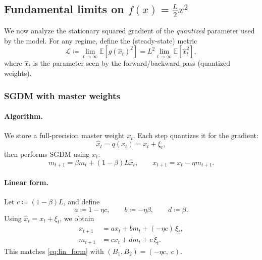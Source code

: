 \documentclass[11pt, a4paper, onecolumn, copyright, goog]{google}
\newcommand{\E}{\mathbb{E}}
\theoremstyle{plain}
\theoremstyle{definition}
\theoremstyle{remark}
\begin{document}
\subsection{Fundamental limits on $f(x)=\frac{L}{2}x^2$}

We now analyze the stationary squared gradient of the \emph{quantized} parameter used by the model.
For any regime, define the (steady-state) metric
\begin{equation}
    \mathcal L \coloneqq \lim_{t\to\infty}\E[g(\hat x_t)^2]
    = L^2 \lim_{t\to\infty}\E[\hat x_t^2],
\end{equation}
where $\hat x_t$ is the parameter seen by the forward/backward pass (quantized weights).

\subsubsection{SGDM with master weights}

\paragraph{Algorithm.}
We store a full-precision master weight $x_t$. Each step quantizes it for the gradient:
\begin{equation}
    \hat x_t=q(x_t)=x_t+\xi_t,
\end{equation}
then performs SGDM using $\hat x_t$:
\begin{equation}
    m_{t+1}=\beta m_t + (1-\beta)L\hat x_t,\qquad x_{t+1}=x_t-\eta m_{t+1}.
\end{equation}

\paragraph{Linear form.}
Let $c\coloneqq (1-\beta)L$, and define
\begin{equation}
    a\coloneqq 1-\eta c,\qquad b\coloneqq -\eta\beta,\qquad d\coloneqq \beta.
\end{equation}
Using $\hat x_t=x_t+\xi_t$, we obtain
\begin{equation}
\label{eq:mw_lin}
\begin{aligned}
    x_{t+1} &= a x_t + b m_t + (-\eta c)\,\xi_t,\\
    m_{t+1} &= c x_t + d m_t + c\,\xi_t.
\end{aligned}
\end{equation}
This matches \eqref{eq:lin_form} with $(B_1,B_2)=(-\eta c,\;c)$.
\end{document}
